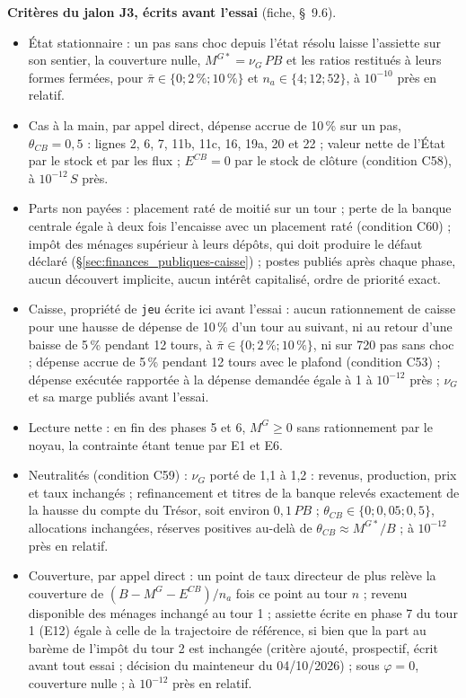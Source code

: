 \documentclass[11pt,a4paper]{article}
\begin{document}
\begin{proposee}
\textbf{Critères du jalon J3, écrits avant l'essai} (fiche, \S~9.6).
\begin{itemize}
\item État stationnaire : un pas sans choc depuis l'état résolu laisse l'assiette sur son sentier, la couverture nulle, $M^{G*} = \nu_G\,\mathit{PB}$ et les ratios restitués à leurs formes fermées, pour $\bar\pi \in \{0 ; 2\,\% ; 10\,\%\}$ et $n_a \in \{4 ; 12 ; 52\}$, à $10^{-10}$ près en relatif.
\item Cas à la main, par appel direct, dépense accrue de 10\,\% sur un pas, $\theta_{\mathit{CB}} = 0{,}5$ : lignes 2, 6, 7, 11b, 11c, 16, 19a, 20 et 22 ; valeur nette de l'État par le stock et par les flux ; $E^{\mathit{CB}} = 0$ par le stock de clôture (condition C58), à $10^{-12}\,S$ près.
\item Parts non payées : placement raté de moitié sur un tour ; perte de la banque centrale égale à deux fois l'encaisse avec un placement raté (condition C60) ; impôt des ménages supérieur à leurs dépôts, qui doit produire le défaut déclaré (\S\ref{sec:finances_publiques-caisse}) ; postes publiés après chaque phase, aucun découvert implicite, aucun intérêt capitalisé, ordre de priorité exact.
\item Caisse, propriété de \texttt{jeu} écrite ici avant l'essai : aucun rationnement de caisse pour une hausse de dépense de 10\,\% d'un tour au suivant, ni au retour d'une baisse de 5\,\% pendant 12 tours, à $\bar\pi \in \{0 ; 2\,\% ; 10\,\%\}$, ni sur 720 pas sans choc ; dépense accrue de 5\,\% pendant 12 tours avec le plafond (condition C53) ; dépense exécutée rapportée à la dépense demandée égale à 1 à $10^{-12}$ près ; $\nu_G$ et sa marge publiés avant l'essai.
\item Lecture nette : en fin des phases 5 et 6, $M^G \ge 0$ sans rationnement par le noyau, la contrainte étant tenue par E1 et E6.
\item Neutralités (condition C59) : $\nu_G$ porté de 1,1 à 1,2 : revenus, production, prix et taux inchangés ; refinancement et titres de la banque relevés exactement de la hausse du compte du Trésor, soit environ $0{,}1\,\mathit{PB}$ ; $\theta_{\mathit{CB}} \in \{0 ; 0{,}05 ; 0{,}5\}$, allocations inchangées, réserves positives au-delà de $\theta_{\mathit{CB}} \approx M^{G*}/B$ ; à $10^{-12}$ près en relatif.
\item Couverture, par appel direct : un point de taux directeur de plus relève la couverture de $(B - M^G - E^{\mathit{CB}})/n_a$ fois ce point au tour $n$ ; revenu disponible des ménages inchangé au tour 1 ; assiette écrite en phase 7 du tour 1 (E12) égale à celle de la trajectoire de référence, si bien que la part au barème de l'impôt du tour 2 est inchangée (critère ajouté, prospectif, écrit avant tout essai ; décision du mainteneur du 04/10/2026) ; sous $\varphi = 0$, couverture nulle ; à $10^{-12}$ près en relatif.

\end{itemize}
\end{proposee}
\end{document}
